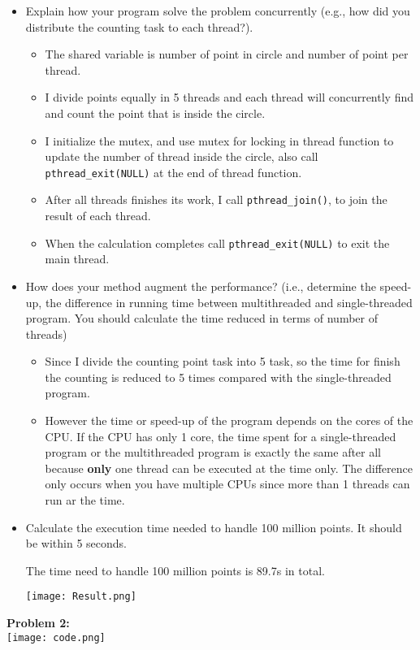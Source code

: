 \documentclass[a4paper]{article}
\begin{document}
\begin{itemize}
    \item Explain how your program solve the problem concurrently (e.g., how did you distribute the counting task to each thread?).

    \begin{itemize}
        \item The shared variable is number of point in circle and number of point per thread.
        \item I divide points equally in 5 threads and each thread will concurrently find and count the point that is inside the circle.
        \item I initialize the mutex, and use mutex for locking in thread function to update the number of thread inside the circle, also call \texttt{pthread\_exit(NULL)} at the end of thread function.
        \item After all threads finishes its work, I call \texttt{pthread\_join()}, to join the result of each thread.
        \item When the calculation completes call \texttt{pthread\_exit(NULL)} to exit the main thread.
    \end{itemize}

    \item How does your method augment the performance? (i.e., determine the speed-up, the difference in running time between multithreaded and single-threaded program. You should calculate the time reduced in terms of number of threads)
    
    \begin{itemize}
        \item Since I divide the counting point task into 5 task, so the time for finish the counting is reduced to 5 times compared with the single-threaded program.
        \item However the time or speed-up of the program depends on the cores of the CPU. If the CPU has only 1 core, the time spent for a single-threaded program or the multithreaded program is exactly the same after all because \textbf{only} one thread can be executed at the time only. The difference only occurs when you have multiple CPUs since more than 1 threads can run ar the time. 
    \end{itemize}

    \item Calculate the execution time needed to handle 100 million points. It should be within 5 seconds. \\
    
    \par{The time need to handle 100 million points is 89.7s in total.}

    \bigbreak
    \texttt{[image: Result.png]}
    \bigbreak
\end{itemize}

\textbf{Problem 2:} \\

\bigbreak
\texttt{[image: code.png]}
\bigbreak
\end{document}
